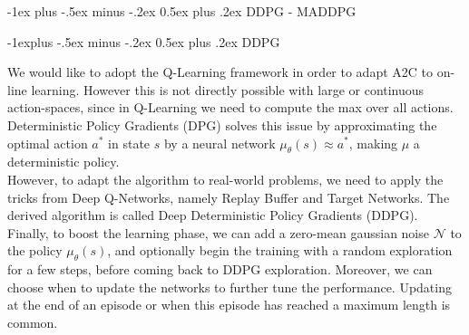 \documentclass[10pt,landscape]{article}
\makeatletter
\renewcommand{\section}{\@startsection{section}{1}{0mm}%
                                {-1ex plus -.5ex minus -.2ex}%
                                {0.5ex plus .2ex}%
                                {\normalfont\large\bfseries}}
\renewcommand{\subsection}{\@startsection{subsection}{2}{0mm}%
                                {-1explus -.5ex minus -.2ex}%
                                {0.5ex plus .2ex}%
                                {\normalfont\normalsize\bfseries}}
\makeatother
\begin{document}
\begin{multicols}{3}


\section{DDPG - MADDPG}

\subsection{DDPG}

We would like to adopt the Q-Learning framework in order to adapt A2C to on-line learning. However this is not directly possible with large or continuous action-spaces, since in Q-Learning we need to compute the max over all actions. \\
\smallskip
Deterministic Policy Gradients (DPG) solves this issue by approximating the optimal action $a^*$ in state $s$ by a neural network $\mu_\theta(s) \approx a^*$, making $\mu$ a deterministic policy.\\
However, to adapt the algorithm to real-world problems, we need to apply the tricks from Deep Q-Networks, namely Replay Buffer and Target Networks. The derived algorithm is called Deep Deterministic Policy Gradients (DDPG).\\
\smallskip
Finally, to boost the learning phase, we can add a zero-mean gaussian noise $\mathcal{N}$ to the policy $\mu_\theta(s)$, and optionally begin the training with a random exploration for a few steps, before coming back to DDPG exploration. Moreover, we can choose when to update the networks to further tune the performance. Updating at the end of an episode or when this episode has reached a maximum length is common.\\

\end{multicols}
\newpage
\end{document}
